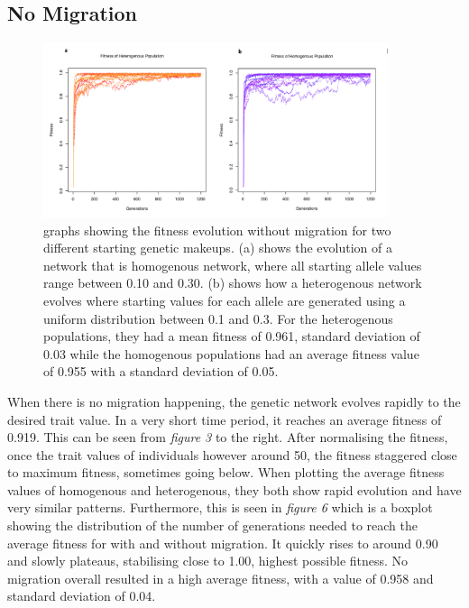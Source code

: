 \subsection{No Migration}
\begin{figure}[h]
    \centering
        \includegraphics[width=0.9\textwidth]{../Results/no_migration.jpg}
    \caption{graphs showing the fitness evolution without migration for two different starting genetic makeups. (a) shows the evolution of a network that is homogenous network, where all starting allele values range between 0.10 and 0.30. (b) shows how a heterogenous network evolves where starting values for each allele are generated using a uniform distribution between 0.1 and 0.3. For the heterogenous populations, they had a mean fitness of 0.961, standard deviation of 0.03 while the homogenous populations had an average fitness value of 0.955 with a standard deviation of 0.05.}
    \label{fig:No Migration}
\end{figure}
When there is no migration happening, the genetic network evolves rapidly to the desired trait value. In a very short time period, it reaches an average fitness of 0.919. This can be seen from \textit{figure 3} to the right. After normalising the fitness, once the trait values of individuals however around 50, the fitness staggered close to maximum fitness, sometimes going below.
When plotting the average fitness values of homogenous and heterogenous, they both show rapid evolution and have very similar patterns. Furthermore, this is seen in \textit{figure 6} which is a boxplot showing the distribution of the number of generations needed to reach the average fitness for with and without migration. It quickly rises to around 0.90 and slowly plateaus, stabilising close to 1.00, highest possible fitness. No migration overall resulted in a high average fitness, with a value of 0.958 and standard deviation of 0.04.
